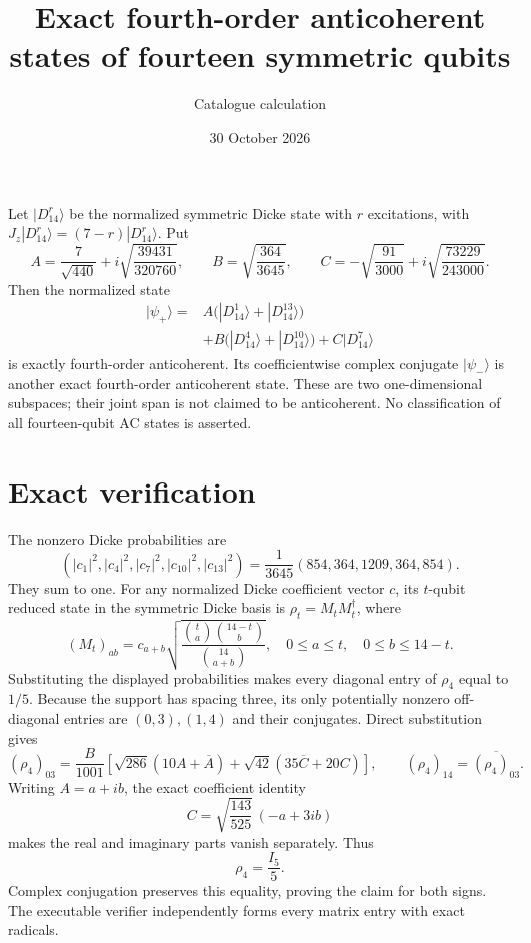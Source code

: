 \documentclass[11pt]{article}
\begin{document}
\title{Exact fourth-order anticoherent states of fourteen symmetric qubits}
\author{Catalogue calculation}
\date{30 October 2026}
\maketitle

Let $|D_{14}^{r}\rangle$ be the normalized symmetric Dicke state with $r$
excitations, with $J_z|D_{14}^{r}\rangle=(7-r)|D_{14}^{r}\rangle$.
Put
\[
 A=\frac{7}{\sqrt{440}}+i\sqrt{\frac{39431}{320760}},\qquad
 B=\sqrt{\frac{364}{3645}},\qquad
 C=-\sqrt{\frac{91}{3000}}+i\sqrt{\frac{73229}{243000}}.
\]
Then the normalized state
\begin{align*}
 |\psi_+\rangle={}&A\bigl(|D_{14}^{1}\rangle+|D_{14}^{13}\rangle\bigr)\\
 &+B\bigl(|D_{14}^{4}\rangle+|D_{14}^{10}\rangle\bigr)
 +C|D_{14}^{7}\rangle
\end{align*}
is exactly fourth-order anticoherent. Its coefficientwise complex conjugate
$|\psi_-\rangle$ is another exact fourth-order anticoherent state.
These are two one-dimensional subspaces; their joint span is not claimed
to be anticoherent. No classification of all fourteen-qubit AC states is asserted.

\section{Exact verification}
The nonzero Dicke probabilities are
\[
(|c_1|^2,|c_4|^2,|c_7|^2,|c_{10}|^2,|c_{13}|^2)
=\frac1{3645}(854,364,1209,364,854).
\]
They sum to one. For any normalized Dicke coefficient vector $c$, its
$t$-qubit reduced state in the symmetric Dicke basis is $\rho_t=M_tM_t^\dagger$,
where
\[
 (M_t)_{ab}=c_{a+b}
 \sqrt{\frac{\binom ta\binom{14-t}b}{\binom{14}{a+b}}},
 \quad 0\le a\le t,\quad 0\le b\le14-t.
\]
Substituting the displayed probabilities makes every diagonal entry of
$\rho_4$ equal to $1/5$. Because the support has spacing three, its only
potentially nonzero off-diagonal entries are $(0,3),(1,4)$ and their conjugates.
Direct substitution gives
\[
 (\rho_4)_{03}=\frac B{1001}
 \left[\sqrt{286}(10A+\overline A)
       +\sqrt{42}(35\overline C+20C)\right],
 \qquad (\rho_4)_{14}=\overline{(\rho_4)_{03}}.
\]
Writing $A=a+ib$, the exact coefficient identity
\[
 C=\sqrt{\frac{143}{525}}\,(-a+3ib)
\]
makes the real and imaginary parts vanish separately. Thus
\[
 \boxed{\rho_4=\frac{I_5}{5}.}
\]
Complex conjugation preserves this equality, proving the claim for both signs.
The executable verifier independently forms every matrix entry with exact radicals.
\end{document}
